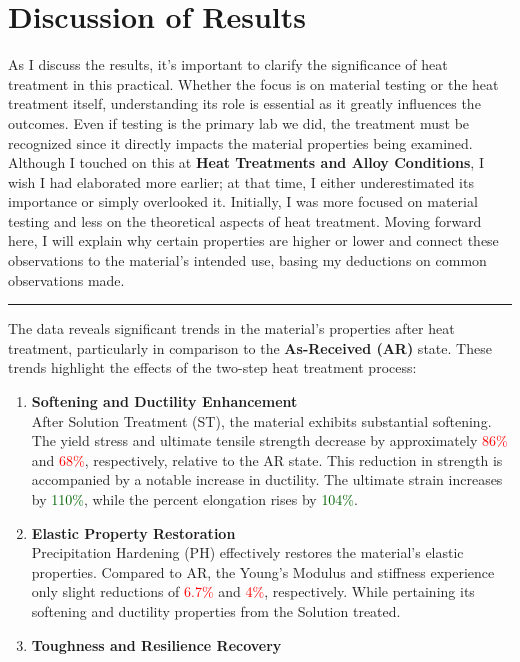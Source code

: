 \documentclass{article}
\begin{document}
{    \section{Discussion of Results}\label{discuss}
    As I discuss the results, it's important to clarify the significance of heat treatment in this practical. Whether the focus is on material testing or the heat treatment itself, understanding its role is essential as it greatly influences the outcomes. Even if testing is the primary lab we did, the treatment must be recognized since it directly impacts the material properties being examined. Although I touched on this at \textbf{Heat Treatments and Alloy Conditions}, I wish I had elaborated more earlier; at that time, I either underestimated its importance or simply overlooked it. Initially, I was more focused on material testing and less on the theoretical aspects of heat treatment. Moving forward here, I will explain why certain properties are higher or lower and connect these observations to the material's intended use, basing my deductions on common observations made.\\[1em]
    \hrule\vspace{1em}
    The data reveals significant trends in the material's properties after heat treatment, particularly in comparison to the \textbf{As-Received (AR)} state. These trends highlight the effects of the two-step heat treatment process:
\begin{enumerate}[itemsep=-1mm]
    \item \textbf{Softening and Ductility Enhancement}\\
    After Solution Treatment (ST), the material exhibits substantial softening. The yield stress and ultimate tensile strength decrease by approximately \textcolor{red}{86\%} and \textcolor{red}{68\%}, respectively, relative to the AR state. This reduction in strength is accompanied by a notable increase in ductility. The ultimate strain increases by \textcolor{darkgreen}{110\%}, while the percent elongation rises by \textcolor{darkgreen}{104\%}.
    \item \textbf{Elastic Property Restoration}\\
    Precipitation Hardening (PH) effectively restores the material's elastic properties. Compared to AR, the Young’s Modulus and stiffness experience only slight reductions of \textcolor{red}{6.7\%} and \textcolor{red}{4\%}, respectively. While pertaining its softening and ductility properties from the Solution treated.
    \item \textbf{Toughness and Resilience Recovery}\\

\end{enumerate}}
\end{document}
